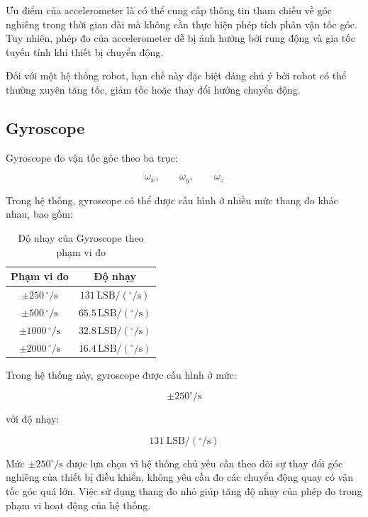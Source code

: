 \documentclass[a4paper,12pt]{report}
\begin{document}
Ưu điểm của accelerometer là có thể cung cấp thông tin tham chiếu về góc nghiêng trong thời gian dài mà không cần thực hiện phép tích phân vận tốc góc. Tuy nhiên, phép đo của accelerometer dễ bị ảnh hưởng bởi rung động và gia tốc tuyến tính khi thiết bị chuyển động.

Đối với một hệ thống robot, hạn chế này đặc biệt đáng chú ý bởi robot có thể thường xuyên tăng tốc, giảm tốc hoặc thay đổi hướng chuyển động.

\subsection{Gyroscope}

Gyroscope đo vận tốc góc theo ba trục:

\begin{equation}
\omega_x,\qquad \omega_y,\qquad \omega_z
\end{equation}

Trong hệ thống, gyroscope có thể được cấu hình ở nhiều mức thang đo khác nhau, bao gồm:

\begin{table}[H]
\centering
\label{tab:gyro_sensitivity}
\begin{tabular}{|c|c|}
\hline
\textbf{Phạm vi đo} & \textbf{Độ nhạy} \\ \hline
$\pm 250\,^\circ/\text{s}$  & $131\,\text{LSB}/(^{\circ}/\text{s})$ \\ \hline
$\pm 500\,^\circ/\text{s}$  & $65.5\,\text{LSB}/(^{\circ}/\text{s})$ \\ \hline
$\pm 1000\,^\circ/\text{s}$ & $32.8\,\text{LSB}/(^{\circ}/\text{s})$ \\ \hline
$\pm 2000\,^\circ/\text{s}$ & $16.4\,\text{LSB}/(^{\circ}/\text{s})$ \\ \hline
\end{tabular}
\caption{Độ nhạy của Gyroscope theo phạm vi đo}
\end{table}

Trong hệ thống này, gyroscope được cấu hình ở mức:

\begin{equation}
\pm 250^\circ/\text{s}
\end{equation}

với độ nhạy:

\begin{equation}
131\ \text{LSB}/(^{\circ}/\text{s})
\end{equation}

Mức $\pm 250^\circ/\text{s}$ được lựa chọn vì hệ thống chủ yếu cần theo dõi sự thay đổi góc nghiêng của thiết bị điều khiển, không yêu cầu đo các chuyển động quay có vận tốc góc quá lớn. Việc sử dụng thang đo nhỏ giúp tăng độ nhạy của phép đo trong phạm vi hoạt động của hệ thống.
\end{document}
